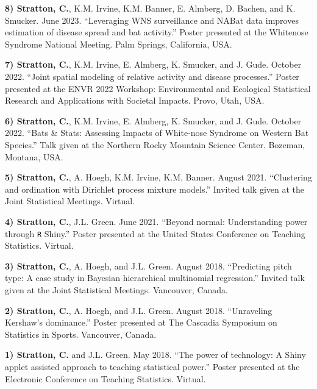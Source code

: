 \documentclass[a4paper]{article}
\begin{document}
\textbf{8) Stratton, C.}, K.M. Irvine, K.M. Banner, E. Almberg, D.
Bachen, and K. Smucker. June 2023. ``Leveraging WNS surveillance and
NABat data improves estimation of disease spread and bat activity.''
Poster presented at the Whitenose Syndrome National Meeting. Palm
Springs, California, USA. \vspace*{2mm}

\textbf{7) Stratton, C.}, K.M. Irvine, E. Almberg, K. Smucker, and J.
Gude. October 2022. ``Joint spatial modeling of relative activity and
disease processes.'' Poster presented at the ENVR 2022 Workshop:
Environmental and Ecological Statistical Research and Applications with
Societal Impacts. Provo, Utah, USA. \vspace*{2mm}

\textbf{6) Stratton, C.}, K.M. Irvine, E. Almberg, K. Smucker, and J.
Gude. October 2022. ``Bats \& Stats: Assessing Impacts of White-nose
Syndrome on Western Bat Species.'' Talk given at the Northern Rocky
Mountain Science Center. Bozeman, Montana, USA. \vspace*{2mm}

\textbf{5) Stratton, C.}, A. Hoegh, K.M. Irvine, K.M. Banner. August
2021. ``Clustering and ordination with Dirichlet process mixture
models.'' Invited talk given at the Joint Statistical Meetings. Virtual.
\vspace*{2mm}

\textbf{4) Stratton, C.}, J.L. Green. June 2021. ``Beyond normal:
Understanding power through \texttt{R} Shiny.'' Poster presented at the
United States Conference on Teaching Statistics. Virtual. \vspace*{2mm}

\textbf{3) Stratton, C.}, A. Hoegh, and J.L. Green. August 2018.
``Predicting pitch type: A case study in Bayesian hierarchical
multinomial regression.'' Invited talk given at the Joint Statistical
Meetings. Vancouver, Canada. \vspace*{2mm}

\textbf{2) Stratton, C.}, A. Hoegh, and J.L. Green. August 2018.
``Unraveling Kershaw's dominance.'' Poster presented at The Cascadia
Symposium on Statistics in Sports. Vancouver, Canada. \vspace*{2mm}

\textbf{1) Stratton, C.} and J.L. Green. May 2018. ``The power of
technology: A Shiny applet assisted approach to teaching statistical
power.'' Poster presented at the Electronic Conference on Teaching
Statistics. Virtual. \vspace*{2mm}
\end{document}
